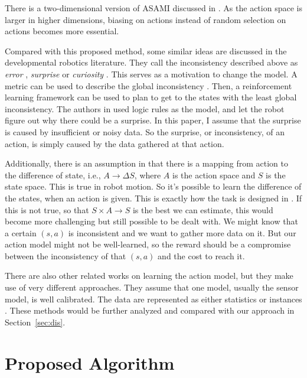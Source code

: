 \documentclass[12pt]{article}
\begin{document}
There is a two-dimensional version of ASAMI discussed in
\cite{ICRA08-stronger}.  As the action space is larger in higher
dimensions, biasing on actions instead of random selection on actions
becomes more essential.

Compared with this proposed method, some similar ideas are discussed
in the developmental robotics literature. They call the inconsistency
described above as \textit{error} \cite{oudeyer2006discovering},
\textit{surprise} \cite{ranasinghe2008surprise} or \textit{curiosity}
\cite{schmidhuber2006developmental}. This serves as a motivation to
change the model. A metric can be used to describe the global
inconsistency \cite{oudeyer2006discovering}. Then, a reinforcement
learning framework can be used to plan to get to the states with the
least global inconsistency. The authors in
\cite{ranasinghe2008surprise} used logic rules as the model, and let
the robot figure out why there could be a surprise. In this paper, I
assume that the surprise is caused by insufficient or noisy data. So
the surprise, or inconsistency, of an action, is simply caused by the
data gathered at that action.

Additionally, there is an assumption in \cite{CSJ06} that there is a
mapping from action to the difference of state, i.e., $A \rightarrow
\Delta S$, where $A$ is the action space and $S$ is the state space.  This
is true in robot motion. So it's possible to learn the difference of
the states, when an action is given. This is
exactly how the task is designed in \cite{ICDL10-hester}. If this is
not true, so that $S \times A \rightarrow S$ is the best we can
estimate, this would become more challenging but still possible to be
dealt with. We might know that a certain $(s, a)$ is inconsistent and
we want to gather more data on it. But our action model might not be
well-learned, so the reward should be a compromise between the
inconsistency of that $(s, a)$ and the cost to reach it.

There are also other related works on learning the action model, but
they make use of very different approaches. They assume that one model,
usually the sensor model, is well calibrated. The data are represented
as either statistics \cite{And_learningand} or instances
\cite{LNAI2007-ahmadi}. These methods would be further analyzed and
compared with our approach in Section~\ref{sec:dis}.

\section{Proposed Algorithm}
\end{document}
